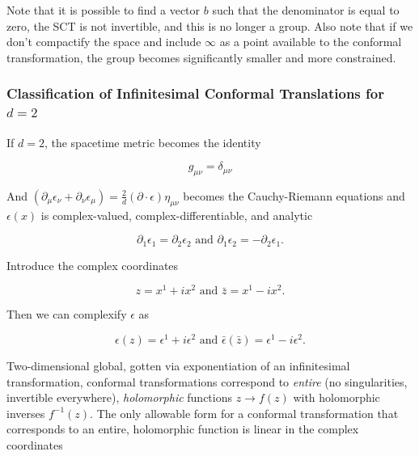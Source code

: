 \noindent Note that it is possible to find a vector $b$ such that the denominator is equal to zero, the SCT is not invertible, and this is no longer a group. Also note that if we don't compactify the space and include $\infty$ as a point available to the conformal transformation, the group becomes significantly smaller and more constrained. \\

\subsubsection*{Classification of Infinitesimal Conformal Translations for $d=2$}

\noindent If $d=2$, the spacetime metric becomes the identity

\begin{equation}
g_{\mu\nu} = \delta_{\mu\nu}
\end{equation}

\noindent And $(\partial_\mu \epsilon_\nu + \partial_\nu \epsilon_\mu) = \frac{2}{d} (\partial \cdot \epsilon) \eta_{\mu\nu}$ becomes the Cauchy-Riemann equations and $\epsilon(x)$ is complex-valued, complex-differentiable, and analytic

\begin{equation}
\partial_1 \epsilon_1 = \partial_2 \epsilon_2 \text{ and } \partial_1 \epsilon_2 = - \partial_2 \epsilon_1.
\end{equation}

\noindent Introduce the complex coordinates

\begin{equation}
z = x^1 + i x^2 \text{ and } \bar{z} = x^1 - i x^2.
\end{equation}

\noindent Then we can complexify $\epsilon$ as

\begin{equation}
\epsilon(z) = \epsilon^1 + i \epsilon^2 \text{ and } \bar{\epsilon}({\bar{z}}) = \epsilon^1 - i \epsilon^2.
\end{equation}

\noindent Two-dimensional global, gotten via exponentiation of an infinitesimal transformation, conformal transformations correspond to \textit{entire} (no singularities, invertible everywhere), \textit{holomorphic} functions $z \rightarrow f(z)$ with holomorphic inverses $f^{-1} (z)$. The only allowable form for a conformal transformation that corresponds to an entire, holomorphic function is linear in the complex coordinates


